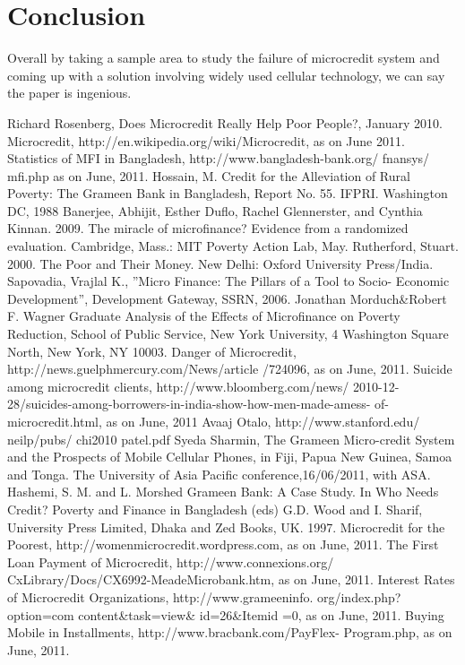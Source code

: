 \documentclass{report}
\begin{document}
\chapter{Conclusion}
Overall by taking a sample area to study the failure of microcredit system and coming up with a solution involving  widely used cellular technology, we can say the paper is ingenious.
\newpage

\begin{thebibliography}{13}
Richard Rosenberg, Does Microcredit Really Help Poor People?, January
2010.
Microcredit, http://en.wikipedia.org/wiki/Microcredit, as on June 2011.
Statistics of MFI in Bangladesh, http://www.bangladesh-bank.org/ fnansys/
mfi.php as on June, 2011.
Hossain, M. Credit for the Alleviation of Rural Poverty: The Grameen
Bank in Bangladesh, Report No. 55. IFPRI. Washington DC, 1988
Banerjee, Abhijit, Esther Duflo, Rachel Glennerster, and Cynthia Kinnan.
2009. The miracle of microfinance? Evidence from a randomized
evaluation. Cambridge, Mass.: MIT Poverty Action Lab, May.
Rutherford, Stuart. 2000. The Poor and Their Money. New Delhi: Oxford
University Press/India.
Sapovadia, Vrajlal K., ”Micro Finance: The Pillars of a Tool to Socio-
Economic Development”, Development Gateway, SSRN, 2006.
Jonathan Morduch\&Robert F. Wagner Graduate Analysis of the Effects
of Microfinance on Poverty Reduction, School of Public Service, New
York University, 4 Washington Square North, New York, NY 10003.
Danger of Microcredit, http://news.guelphmercury.com/News/article
/724096, as on June, 2011.
Suicide among microcredit clients, http://www.bloomberg.com/news/
2010-12-28/suicides-among-borrowers-in-india-show-how-men-made-amess-
of-microcredit.html, as on June, 2011
Avaaj Otalo, http://www.stanford.edu/ neilp/pubs/
chi2010 patel.pdf
Syeda Sharmin, The Grameen Micro-credit System and the Prospects of
Mobile Cellular Phones, in Fiji, Papua New Guinea, Samoa and Tonga.
The University of Asia Pacific conference,16/06/2011, with ASA.
Hashemi, S. M. and L. Morshed Grameen Bank: A Case Study. In Who
Needs Credit? Poverty and Finance in Bangladesh (eds) G.D. Wood and
I. Sharif, University Press Limited, Dhaka and Zed Books, UK. 1997.
Microcredit for the Poorest, http://womenmicrocredit.wordpress.com, as
on June, 2011.
The First Loan Payment of Microcredit, http://www.connexions.org/
CxLibrary/Docs/CX6992-MeadeMicrobank.htm, as on June, 2011.
Interest Rates of Microcredit Organizations, http://www.grameeninfo.
org/index.php?option=com content\&task=view\& id=26\&Itemid =0,
as on June, 2011.
Buying Mobile in Installments, http://www.bracbank.com/PayFlex-
Program.php, as on June, 2011.

\end{thebibliography}
\end{document}
